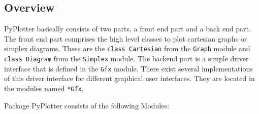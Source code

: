 \documentclass[12pt,a4paper,USenglish]{article}
\begin{document}
\subsection{Overview}

{\sf PyPlotter} basically consists of two parts, a front end part and
a back end part. The front end part comprises the high level classes
to plot cartesian graphs or simplex diagrams. These are the {\tt class
Cartesian} from the {\tt Graph} module and {\tt class Diagram} from
the {\tt Simplex} module. The backend part is a simple driver
interface that is defined in the {\tt Gfx} module. There exist several
implementations of this driver interface for different graphical user
interfaces. They are located in the modules named {\tt **Gfx}.

Package PyPlotter consists of the following Modules: 
\end{document}
